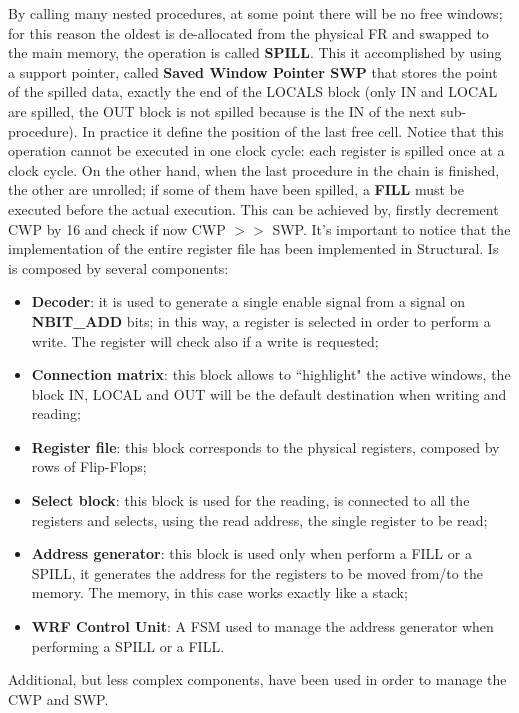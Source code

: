 By calling many nested procedures, at some point there will be no free windows; for this reason the oldest is de-allocated from the physical FR and swapped to the main memory, the operation is called \textbf{SPILL}. This it accomplished by using a support pointer, called \textbf{Saved Window Pointer SWP} that stores the point of the spilled data, exactly the end of the LOCALS block (only IN and LOCAL are spilled, the OUT block is not spilled because is the IN of the next sub-procedure). In practice it define the position of the last free cell. Notice that this operation cannot be executed in one clock cycle: each register is spilled once at a clock cycle.\newline\newline
On the other hand, when the last procedure in the chain is finished, the other are unrolled; if some of them have been spilled, a \textbf{FILL} must be executed before the actual execution. This can be achieved by, firstly decrement CWP by 16 and check if now CWP $>>$ SWP.\newline\newline
It's important to notice that the implementation of the entire register file has been implemented in Structural. Is is composed by several components:
\begin{itemize}
	\item \textbf{Decoder}: it is used to generate a single enable signal from a signal on \textbf{NBIT\_ADD} bits; in this way, a register is selected in order to perform a write. The register will check also if a write is requested;
	\item \textbf{Connection matrix}: this block allows to ``highlight" the active windows, the block IN, LOCAL and OUT will be the default destination when writing and reading;
	\item \textbf{Register file}: this block corresponds to the physical registers, composed by rows of Flip-Flops;
	\item \textbf{Select block}: this block is used for the reading, is connected to all the registers and selects, using the read address, the single register to be read;
	\item \textbf{Address generator}: this block is used only when perform a FILL or a SPILL, it generates the address for the registers to be moved from/to the memory. The memory, in this case works exactly like a stack;
	\item \textbf{WRF Control Unit}: A FSM used to manage the address generator when performing a SPILL or a FILL.
\end{itemize}
Additional, but less complex components, have been used in order to manage the CWP and SWP.


